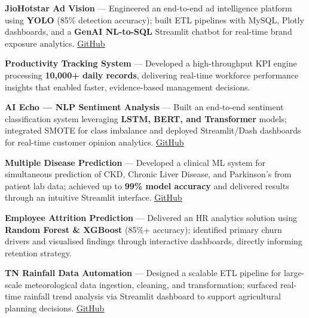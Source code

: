 \documentclass[letterpaper,10pt]{article}
\newcommand{\resumeItem}[1]{
  \item\small{#1\vspace{-2pt}}
}
\begin{document}
  \resumeItem{\textbf{JioHotstar Ad Vision} --- Engineered an end-to-end ad intelligence platform using \textbf{YOLO} (85\% detection accuracy); built ETL pipelines with MySQL, Plotly dashboards, and a \textbf{GenAI NL-to-SQL} Streamlit chatbot for real-time brand exposure analytics. \href{https://github.com/arun8nov/JioHotstar-Ad-Vision}{\color{headingblue}\underline{GitHub}}}
  \vspace{-4pt}

  \resumeItem{\textbf{Productivity Tracking System} --- Developed a high-throughput KPI engine processing \textbf{10,000+ daily records}, delivering real-time workforce performance insights that enabled faster, evidence-based management decisions.}
  \vspace{-4pt}

  \resumeItem{\textbf{AI Echo --- NLP Sentiment Analysis} --- Built an end-to-end sentiment classification system leveraging \textbf{LSTM, BERT, and Transformer} models; integrated SMOTE for class imbalance and deployed Streamlit/Dash dashboards for real-time customer opinion analytics. \href{https://github.com/arun8nov/AI-Echo-NLP-Sentimental-Analysis}{\color{headingblue}\underline{GitHub}}}
  \vspace{-4pt}

  \resumeItem{\textbf{Multiple Disease Prediction} --- Developed a clinical ML system for simultaneous prediction of CKD, Chronic Liver Disease, and Parkinson's from patient lab data; achieved up to \textbf{99\% model accuracy} and delivered results through an intuitive Streamlit interface. \href{https://github.com/arun8nov/Multiple-Disease-prediction}{\color{headingblue}\underline{GitHub}}}
  \vspace{-4pt}

  \resumeItem{\textbf{Employee Attrition Prediction} --- Delivered an HR analytics solution using \textbf{Random Forest \& XGBoost} (85\%+ accuracy); identified primary churn drivers and visualised findings through interactive dashboards, directly informing retention strategy.}
  \vspace{-4pt}

  \resumeItem{\textbf{TN Rainfall Data Automation} --- Designed a scalable ETL pipeline for large-scale meteorological data ingestion, cleaning, and transformation; surfaced real-time rainfall trend analysis via Streamlit dashboard to support agricultural planning decisions. \href{https://github.com/arun8nov/TN_RainfallData_Automation}{\color{headingblue}\underline{GitHub}}}
\end{document}

